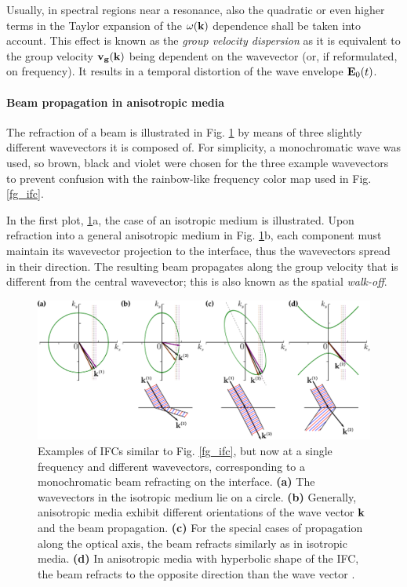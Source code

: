 Usually, in spectral regions near a resonance, also the quadratic or even higher terms in the Taylor expansion of the $\omega({\mathbf{k}})$ dependence shall be taken into account. This effect is known as the \textit{group velocity dispersion} as it is equivalent to the group velocity ${\mathbf{v_g}}({\mathbf{k}})$ being dependent on the wavevector (or, if reformulated, on frequency). It results in a temporal distortion of the wave envelope $\mathbf{E}_0(t)$.  %
\paragraph{Beam propagation in anisotropic media}  %
The refraction of a beam is illustrated in Fig. \ref{fg_ifc2} by means of three slightly different wavevectors it is composed of. For simplicity, a monochromatic wave was used, so brown, black and violet were chosen for the three example wavevectors to prevent confusion with the rainbow-like frequency color map used in Fig. \ref{fg_ifc}. 

In the first plot, \ref{fg_ifc2}a, the case of an isotropic medium is illustrated. Upon refraction into a general anisotropic medium in Fig. \ref{fg_ifc2}b, each component must maintain its wavevector projection to the interface, thus the wavevectors spread in their direction. The resulting beam propagates along the group velocity that is different from the central wavevector; %
this is also known as the spatial \textit{walk-off}.
\begin{figure}[ht] \caption{Examples of IFCs similar to Fig. \ref{fg_ifc}, but now at a single frequency and different wavevectors, corresponding to a monochromatic beam refracting on the interface. \textbf{(a)} The wavevectors in the isotropic medium lie on a circle.
		\textbf{(b)} Generally, anisotropic media exhibit different orientations of the wave vector ${\mathbf{k}}$ and the beam propagation. \textbf{(c)} For the special cases of propagation along the optical axis, the beam refracts similarly as in isotropic media.
	\textbf{(d)} In anisotropic media with hyperbolic shape of the IFC, the beam refracts to the opposite direction than the wave vector \cite{lindell2001bw}. } \label{fg_ifc2} \centering 
	\includegraphics[width=\textwidth]{img/ifc_kdispersion_hyp.pdf} 
\end{figure}

